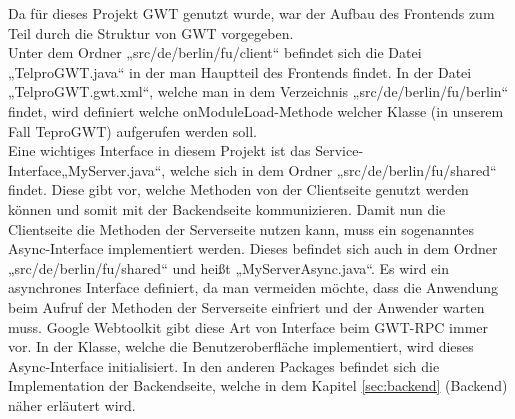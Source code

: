 \documentclass[12pt,a4paper,twoside]{article}
\begin{document}
Da für dieses Projekt GWT genutzt wurde, war der Aufbau des Frontends zum Teil durch die Struktur von GWT vorgegeben. \\
Unter dem Ordner „src/de/berlin/fu/client“ befindet sich die Datei „TelproGWT.java“ in der man Hauptteil des Frontends findet. In der Datei „TelproGWT.gwt.xml“, welche man in dem Verzeichnis „src/de/berlin/fu/berlin“ findet, wird definiert welche onModuleLoad-Methode welcher Klasse (in unserem Fall TeproGWT) aufgerufen werden soll. \\
Eine wichtiges Interface in diesem Projekt ist das Service-Interface„MyServer.java“, welche sich in dem Ordner „src/de/berlin/fu/shared“ findet. Diese gibt vor, welche Methoden von der Clientseite genutzt werden können und somit mit der Backendseite kommunizieren. Damit nun die Clientseite die Methoden der Serverseite nutzen kann, muss ein sogenanntes Async-Interface implementiert werden. Dieses befindet sich auch in dem Ordner „src/de/berlin/fu/shared“ und heißt „MyServerAsync.java“. Es wird ein asynchrones Interface definiert, da man vermeiden möchte, dass die Anwendung beim Aufruf der Methoden der Serverseite einfriert und der Anwender warten muss. Google Webtoolkit gibt diese Art von Interface beim GWT-RPC immer vor. In der Klasse, welche die Benutzeroberfläche implementiert, wird dieses Async-Interface initialisiert. 
In den anderen Packages befindet sich die Implementation der Backendseite, welche in dem Kapitel \ref{sec:backend} (Backend) näher erläutert wird.
\end{document}
